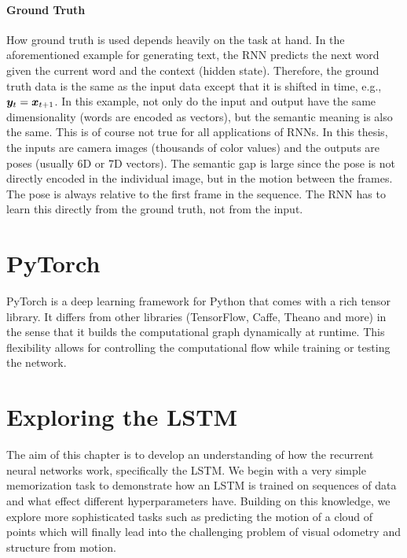 		\paragraph{Ground Truth}
		How ground truth is used depends heavily on the task at hand.
		In the aforementioned example for generating text, the RNN predicts the next word given the current word and the context (hidden state).
		Therefore, the ground truth data is the same as the input data except that it is shifted in time, e.g., $\bm{y}_t = \bm{x}_{t + 1}$.
		In this example, not only do the input and output have the same dimensionality (words are encoded as vectors), but the semantic meaning is also the same.
		This is of course not true for all applications of RNNs.
		In this thesis, the inputs are camera images (thousands of color values) and the outputs are poses (usually 6D or 7D vectors).
		The semantic gap is large since the pose is not directly encoded in the individual image, but in the motion between the frames.
		The pose is always relative to the first frame in the sequence.
		The RNN has to learn this directly from the ground truth, not from the input.
		
		
		
	\section{PyTorch}
		PyTorch is a deep learning framework for Python that comes with a rich tensor library.
		It differs from other libraries (TensorFlow, Caffe, Theano and more) in the sense that it builds the computational graph dynamically at runtime.
		This flexibility allows for controlling the computational flow while training or testing the network.
		
		
		
	\section{Exploring the LSTM}

		The aim of this chapter is to develop an understanding of how the recurrent neural networks work, specifically the LSTM.
		We begin with a very simple memorization task to demonstrate how an LSTM is trained on sequences of data and what effect different hyperparameters have.
		Building on this knowledge, we explore more sophisticated tasks such as predicting the motion of a cloud of points which will finally lead into the challenging problem of visual odometry and structure from motion.
	
